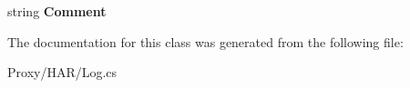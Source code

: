 \begin{DoxyCompactItemize}
\item 
\hypertarget{class_proto_test_1_1_golem_1_1_proxy_1_1_h_a_r_1_1_log_a34ecc835beb129c93cd174b91fe2c8da}{string {\bfseries Comment}}\label{class_proto_test_1_1_golem_1_1_proxy_1_1_h_a_r_1_1_log_a34ecc835beb129c93cd174b91fe2c8da}

\end{DoxyCompactItemize}


The documentation for this class was generated from the following file\-:\begin{DoxyCompactItemize}
\item 
Proxy/\-H\-A\-R/Log.\-cs\end{DoxyCompactItemize}
